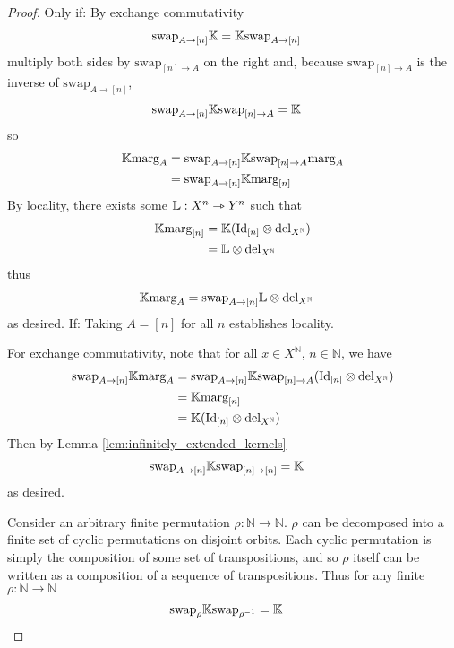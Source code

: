 \begin{proof}
Only if:
By exchange commutativity
\begin{align}
    \text{swap}_{A\rightarrow [n]} \mathbb{K} &= \mathbb{K} \text{swap}_{A\rightarrow [n]}
\end{align}
multiply both sides by $\text{swap}_{[n]\rightarrow A}$ on the right and, because $\text{swap}_{[n]\rightarrow A}$ is the inverse of $\text{swap}_{A\rightarrow [n]}$,
\begin{align}
        \text{swap}_{A\rightarrow [n]} \mathbb{K}\text{swap}_{[n] \rightarrow A} &= \mathbb{K}
\end{align}
so
\begin{align}
    \mathbb{K}\text{marg}_A &= \text{swap}_{A\rightarrow [n]} \mathbb{K}\text{swap}_{[n]\rightarrow A}\text{marg}_A\\
    &= \text{swap}_{A\rightarrow [n]} \mathbb{K}\text{marg}_{[n]}
\end{align}
By locality, there exists some $\mathbb{L}:X^n\rightarrowtriangle Y^n$ such that
\begin{align}
    \mathbb{K} \text{marg}_{[n]} &= \mathbb{K}(\text{Id}_{[n]}\otimes \text{del}_{X^{\mathbb{N}}})\\
     &= \mathbb{L}\otimes \mathrm{del}_{X^{\mathbb{N}}}
\end{align}
thus
\begin{align}
    \mathbb{K} \text{marg}_A &= \text{swap}_{A\rightarrow [n]} \mathbb{L}\otimes \text{del}_{X^{\mathbb{N}}}
\end{align}
as desired.
If:
Taking $A=[n]$ for all $n$ establishes locality.

For exchange commutativity, note that for all $x\in X^{\mathbb{N}}$, $n\in\mathbb{N}$, we have
\begin{align}
    \text{swap}_{A\rightarrow [n]} \mathbb{K} \text{marg}_A &= \text{swap}_{A\rightarrow [n]} \mathbb{K} \text{swap}_{[n]\rightarrow A} (\text{Id}_{[n]}\otimes \text{del}_{X^{\mathbb{N}}})\\
     &= \mathbb{K} \text{marg}_{[n]}\\
     &= \mathbb{K}(\text{Id}_{[n]}\otimes \text{del}_{X^{\mathbb{N}}})
\end{align}
Then by Lemma \ref{lem:infinitely_extended_kernels}
\begin{align}
    \text{swap}_{A\rightarrow [n]} \mathbb{K} \text{swap}_{[n]\rightarrow [n]} &= \mathbb{K}
\end{align}
as desired.

Consider an arbitrary finite permutation $\rho:\mathbb{N}\to \mathbb{N}$. $\rho$ can be decomposed into a finite set of cyclic permutations on disjoint orbits. Each cyclic permutation is simply the composition of some set of transpositions, and so $\rho$ itself can be written as a composition of a sequence of transpositions. Thus for any finite $\rho:\mathbb{N}\to\mathbb{N}$
\begin{align}
    \text{swap}_{\rho} \mathbb{K} \text{swap}_{\rho^{-1}} &= \mathbb{K}
\end{align}
\end{proof}


